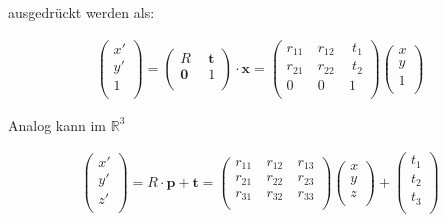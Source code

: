 ausgedrückt werden als:

\begin{eqnarray}
\left(
\begin{array}{c}
x'\\
y'\\
1\\
\end{array}
\right) =
\left(
\begin{array}{c|c}
R\ & \ \bm{t}\\
\hline
\bm{0}\ & \ 1\\
\end{array}
\right)
\cdot\bm{x} =
\left(
\begin{array}{cc|c}
r_{11}\ & r_{12}\ & \ t_1\\
r_{21}\ & r_{22}\ & \ t_2\\
\hline
0\ & 0\ & 1\\
\end{array}
\right)
\left(
\begin{array}{c}
x\\
y\\
1\\
\end{array}
\right)%
\end{eqnarray}

Analog kann im $\mathbb{R}^3$

\begin{eqnarray}
\left(
\begin{array}{c}
x'\\
y'\\
z'\\
\end{array}
\right) = R\cdot\bm{p}+\bm{t} =
\left(
\begin{array}{ccc}
r_{11}\ & r_{12}\ & r_{13}\\
r_{21}\ & r_{22}\ & r_{23}\\
r_{31}\ & r_{32}\ & r_{33}\\
\end{array}
\right)
\left(
\begin{array}{c}
x\\
y\\
z\\
\end{array}
\right) +
\left(
\begin{array}{c}
t_1\\
t_2\\
t_3\\
\end{array}
\right)%
\end{eqnarray}

